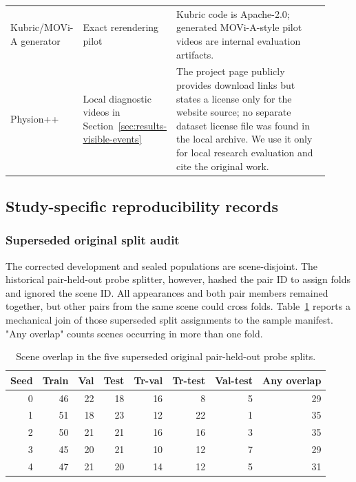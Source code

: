 \begin{table}[htbp]
\begin{tabular}{@{}>{\raggedright\arraybackslash}p{0.21\linewidth}>{\raggedright\arraybackslash}p{0.22\linewidth}>{\raggedright\arraybackslash}p{0.49\linewidth}@{}}
Kubric/MOVi-A generator & Exact rerendering pilot & Kubric code is Apache-2.0; generated MOVi-A-style pilot videos are internal evaluation artifacts. \\
Physion++ & Local diagnostic videos in Section~\ref{sec:results-visible-events} & The project page publicly provides download links but states a license only for the website source; no separate dataset license file was found in the local archive. We use it only for local research evaluation and cite the original work. \\
\bottomrule
\end{tabular}
\end{table}

\subsection{Study-specific reproducibility records}
\subsubsection{Superseded original split audit}
\label{app:intphys-split-audit}
The corrected development and sealed populations are scene-disjoint. The historical pair-held-out probe splitter, however, hashed the pair ID to assign folds and ignored the scene ID. All appearances and both pair members remained together, but other pairs from the same scene could cross folds. Table~\ref{tab:scene-overlap} reports a mechanical join of those superseded split assignments to the sample manifest. "Any overlap" counts scenes occurring in more than one fold.

\begin{table}[htbp]
\centering
\small
\caption{Scene overlap in the five superseded original pair-held-out probe splits.}
\label{tab:scene-overlap}
\begin{tabular}{rrrrrrrr}
\toprule
Seed & Train & Val & Test & Tr-val & Tr-test & Val-test & Any overlap \\
\midrule
0 & 46 & 22 & 18 & 16 & 8 & 5 & 29 \\
1 & 51 & 18 & 23 & 12 & 22 & 1 & 35 \\
2 & 50 & 21 & 21 & 16 & 16 & 3 & 35 \\
3 & 45 & 20 & 21 & 10 & 12 & 7 & 29 \\
4 & 47 & 21 & 20 & 14 & 12 & 5 & 31 \\
\bottomrule
\end{tabular}
\end{table}

